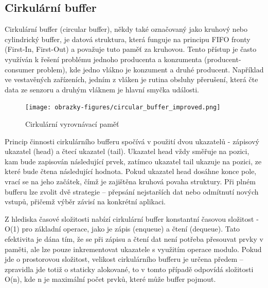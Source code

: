 \newpage

\subsection{Cirkulární buffer}
\label{cirkularni_buffer}
Cirkulární buffer (circular buffer), někdy také označovaný jako kruhový nebo cylindrický buffer, je datová struktura, která funguje na principu FIFO fronty (First-In, First-Out) a považuje tuto paměť za kruhovou. Tento přístup je často využíván k řešení problému jednoho producenta a konzumenta (producent-consumer problem), kde jedno vlákno je konzument a druhé producent. Například ve vestavěných zařízeních, jedním z vláken je rutina obsluhy přerušení, která čte data ze senzoru a druhým vláknem je hlavní smyčka události. \cite{embedjournal_ring_buffer}


\begin{figure}[h]
    \centering
    \texttt{[image: obrazky-figures/circular\_buffer\_improved.png]}
    
    \caption{Cirkulární vyrovnávací paměť}
    \label{fig:circular-buffer}
\end{figure}

Princip činnosti cirkulárního bufferu spočívá v použití dvou ukazatelů - zápisový ukazatel (head) a čtecí ukazatel (tail). Ukazatel head vždy směřuje na pozici, kam bude zapisován následující prvek, zatímco ukazatel tail ukazuje na pozici, ze které bude čtena následující hodnota. Pokud ukazatel head dosáhne konce pole, vrací se na jeho začátek, čímž je zajištěna kruhová povaha struktury. Při plném bufferu lze zvolit dvě strategie – přepsání nejstarších dat nebo odmítnutí nových vstupů, přičemž výběr závisí na konkrétní aplikaci. \cite{embedjournal_ring_buffer, medium_ring_buffer}

Z hlediska časové složitosti nabízí cirkulární buffer konstantní časovou složitost - O(1) pro základní operace, jako je zápis (enqueue) a  čtení (dequeue). Tato efektivita je dána tím, že se při zápisu a čtení dat není potřeba přesouvat prvky v paměti, ale lze pouze inkrementovat ukazatele s využitím operace modulo. Pokud jde o prostorovou složitost, velikost cirkulárního bufferu je určena předem – zpravidla jde totiž o staticky alokované, to v tomto případě odpovídá složitosti O(n), kde n je maximální počet prvků, které může buffer pojmout. \cite{petrungaro_ring_buffer_complexity}

